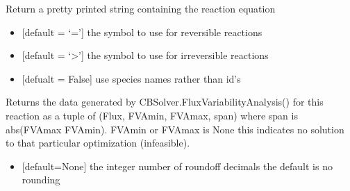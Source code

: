 \documentclass[letterpaper,10pt,english]{sphinxmanual}
\begin{document}
\begin{fulllineitems}
\begin{fulllineitems}
\begin{itemize}
\end{itemize}

\end{fulllineitems}


\begin{fulllineitems}
\label{\detokenize{modules_doc:cbmpy.CBModel.Reaction.getEquation}}
\pysigstartsignatures
{}
\pysigstopsignatures
\sphinxAtStartPar
Return a pretty printed string containing the reaction equation
\begin{itemize}
\item {} 
\sphinxAtStartPar
{} {[}default = ‘=’{]} the symbol to use for reversible reactions

\item {} 
\sphinxAtStartPar
{} {[}default = ‘\textgreater{}’{]} the symbol to use for irreversible reactions

\item {} 
\sphinxAtStartPar
{} {[}defualt = False{]} use species names rather than id’s

\end{itemize}

\end{fulllineitems}


\begin{fulllineitems}
\label{\detokenize{modules_doc:cbmpy.CBModel.Reaction.getFVAdata}}
\pysigstartsignatures
{}
\pysigstopsignatures
\sphinxAtStartPar
Returns the data generated by CBSolver.FluxVariabilityAnalysis() for this reaction as a tuple of
(Flux, FVAmin, FVAmax, span) where span is abs(FVAmax \sphinxhyphen{} FVAmin). FVAmin or FVAmax is None this indicates no solution
to that particular optimization (infeasible).
\begin{itemize}
\item {} 
\sphinxAtStartPar
{} {[}default=None{]} the integer number of roundoff decimals the default is no rounding


\end{itemize}
\end{fulllineitems}
\end{fulllineitems}
\end{document}

